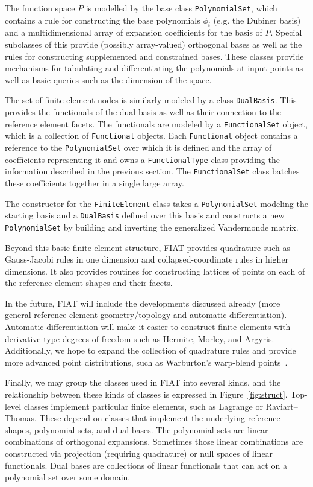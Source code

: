 
The function space \(P\) is modelled by the base class
\texttt{PolynomialSet}, which contains a rule for constructing the base
polynomials \( \phi_i \) (e.g. the Dubiner basis) and a multidimensional
array of expansion coefficients for the basis of \( P \).  Special
subclasses of this provide (possibly array-valued) orthogonal bases as
well as the rules for constructing supplemented and constrained bases.
These classes provide mechanisms for tabulating and differentiating
the polynomials at input points as well as basic queries such as the
dimension of the space.

The set of finite element nodes is similarly modeled by a class
\texttt{DualBasis}.  This provides the functionals of the dual basis as
well as their connection to the reference element facets.  The functionals
are modeled by a \texttt{FunctionalSet} object, which is a collection of
\texttt{Functional} objects.  Each \texttt{Functional} object contains a
reference to the \texttt{PolynomialSet} over which it is defined and the
array of coefficients representing it and owns a \texttt{FunctionalType}
class providing the information described in the previous section.
The \texttt{FunctionalSet} class batches these coefficients together in
a single large array.

The constructor for the \texttt{FiniteElement} class takes
a \texttt{PolynomialSet} modeling the starting basis and a
\texttt{DualBasis} defined over this basis and constructs a new
\texttt{PolynomialSet} by building and inverting the generalized
Vandermonde matrix.

Beyond this basic finite element structure, FIAT provides quadrature such
as Gauss-Jacobi rules in one dimension and collapsed-coordinate rules in
higher dimensions.  It also provides routines for constructing lattices
of points on each of the reference element shapes and their facets.

In the future, FIAT will include the developments discussed already
(more general reference element geometry/topology and automatic
differentiation).  Automatic differentiation will make it easier
to construct finite elements with derivative-type degrees
of freedom such as Hermite, Morley, and Argyris.  Additionally,
we hope to expand the collection of quadrature rules and provide
more advanced point distributions, such as Warburton's warp-blend
points~\citep{Warburton2005}.

Finally, we may group the classes used in FIAT into several kinds,
and the relationship between these kinds of classes is expressed in
Figure~\ref{fig:struct}.  Top-level classes implement particular finite
elements, such as Lagrange or Raviart--Thomas.  These depend on classes
that implement the underlying reference shapes, polynomial sets, and
dual bases. The polynomial sets are linear combinations of orthogonal
expansions. Sometimes those linear combinations are constructed via
projection (requiring quadrature) or null spaces of linear functionals.
Dual bases are collections of linear functionals that can act on a
polynomial set over some domain.

